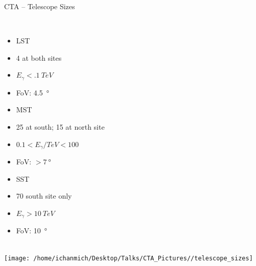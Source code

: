 \documentclass[8pt]{beamer}
\newcommand\unit[2]{\SI{#1}{#2}}
\begin{document}
    \begin{frame}{CTA -- Telescope Sizes}
        \centering
        \begin{minipage}{.075\textwidth}
        \ \\
        \end{minipage}%
        \begin{minipage}{.25\textwidth}
            \begin{itemize}
                \item[] LST
                \item 4 at both sites
                \item $E_\gamma < \unit{.1}{TeV}$
                \item FoV: \unit{4.5}{\degree}
            \end{itemize}
        \end{minipage}%
        \begin{minipage}{.33\textwidth}
            \begin{itemize}
                \item[] MST
                \item 25 at south; 15 at north site
                \item $0.1 < E_\gamma/\si{TeV} < 100$
                \item FoV: $> \unit{7}{\degree}$
            \end{itemize}
        \end{minipage}%
        \begin{minipage}{.3\textwidth}
            \begin{itemize}
                \item[] SST
                \item 70 south site only
                \item $E_\gamma > \unit{10}{TeV}$
                \item FoV: \unit{10}{\degree}
            \end{itemize}
        \end{minipage}\\
        \vspace{12pt}
        \texttt{[image: /home/ichanmich/Desktop/Talks/CTA\_Pictures//telescope\_sizes]}\\
        
     \end{frame}

    
    
\end{document}
